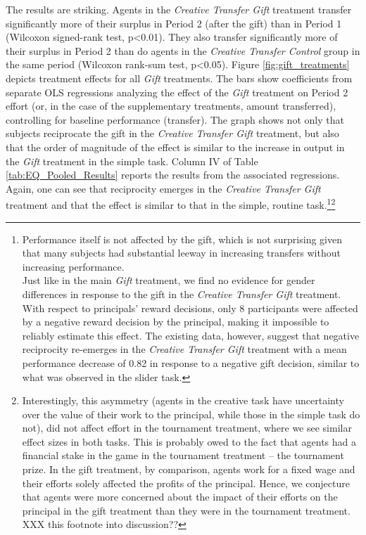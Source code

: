 The results are striking. Agents in the \textit{Creative Transfer Gift} treatment 
 transfer significantly more of their surplus
 in Period 2 (after the gift) than in Period 1 (Wilcoxon signed-rank test, p<0.01).  They also 
transfer significantly more of their surplus in Period 2 than do agents in the 
\textit{Creative Transfer Control} group in the same period (Wilcoxon rank-sum test, p<0.05).   
Figure \ref{fig:gift_treatments} depicts treatment effects for all \textit{Gift} 
treatments. The bars show coefficients from 
separate OLS regressions analyzing the effect of the \textit{Gift} treatment 
on Period 2 effort (or, in the case of the 
supplementary treatments, amount transferred), controlling for 
baseline performance (transfer). The graph shows not only that 
 subjects reciprocate the gift in the  \textit{Creative Transfer Gift} treatment, but also that the 
order of magnitude of the effect is similar to the increase in output in the \textit{Gift} treatment
 in the simple task. 
Column IV of Table \ref{tab:EQ_Pooled_Results} 
reports the results from the associated regressions. Again, one can see that reciprocity 
emerges in the \textit{Creative Transfer Gift} treatment and that the effect is similar to 
that in the simple, routine task.\footnote{Performance 
itself is not affected by the gift, which is not surprising given that many subjects had 
substantial leeway in increasing transfers without increasing performance. \\
Just like in the main \textit{Gift} treatment, we find no evidence for gender differences in response to the gift in the 
\textit{Creative Transfer Gift} treatment.\\ 
With respect to principals' reward decisions, only 8 participants were affected by a negative 
reward decision by the principal, making it impossible to reliably estimate this effect. 
The existing data, however, suggest that negative reciprocity  re-emerges 
in the \textit{Creative Transfer Gift} treatment with a mean performance 
decrease of 0.82 in response to a negative gift decision, similar to what was 
observed in the slider task. }\footnote{Interestingly, this asymmetry (agents in the creative task have uncertainty over 
the value of their work to the principal, while those in the simple task do not), did not affect effort in the tournament treatment, where we see
 similar effect sizes in both tasks. This is probably owed to the fact that agents had 
a financial stake in the game in the tournament treatment -- the tournament prize. In the gift 
treatment, by comparison, agents work for a fixed wage and their efforts solely affected the profits 
of the principal. Hence, we conjecture that agents were more concerned about the impact of their efforts on the principal 
in the gift treatment than they were in the tournament treatment. XXX this footnote into discussion??} 
     



